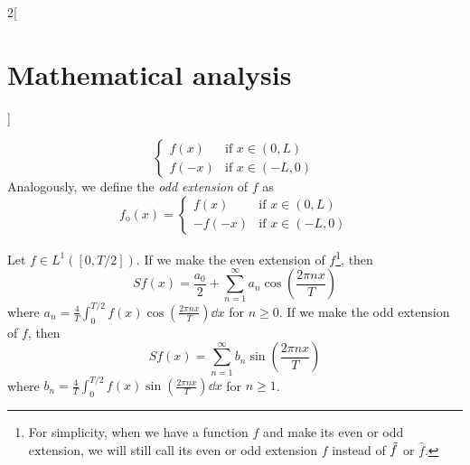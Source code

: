 \documentclass[../../../main_math.tex]{subfiles}
\begin{document}
\begin{multicols}{2}[\section{Mathematical analysis}]
\begin{definition}
$$      \begin{cases}
        f(x)  & \text{if }x\in(0,L)  \\
        f(-x) & \text{if }x\in(-L,0)
      \end{cases}$$ Analogously, we define the \emph{odd extension} of $f$ as $$f_\mathrm{o}(x)=
      \begin{cases}
        f(x)   & \text{if }x\in(0,L)  \\
        -f(-x) & \text{if }x\in(-L,0)
      \end{cases}$$
  \end{definition}
  \begin{proposition}
    Let $f\in L^1([0,T/2])$. If we make the even extension of $f$\footnote{For simplicity, when we have a function $f$ and make its even or odd extension, we will still call its even or odd extension $f$ instead of $\Tilde{f}$ or $\hat{f}$.}, then $$Sf(x)=\frac{a_0}{2}+\sum_{n=1}^\infty a_n\cos\left(\frac{2\pi nx}{T}\right)$$ where $\displaystyle a_n=\frac{4}{T}\int_0^{T/2}f(x)\cos\left(\frac{2\pi nx}{T}\right)\dd{x}$ for $n\geq 0$. If we make the odd extension of $f$, then $$Sf(x)=\sum_{n=1}^\infty b_n\sin\left(\frac{2\pi nx}{T}\right)$$ where $\displaystyle b_n=\frac{4}{T}\int_0^{T/2}f(x)\sin\left(\frac{2\pi nx}{T}\right)\dd{x}$ for $n\geq 1$.
  \end{proposition}

\end{multicols}
\end{document}
